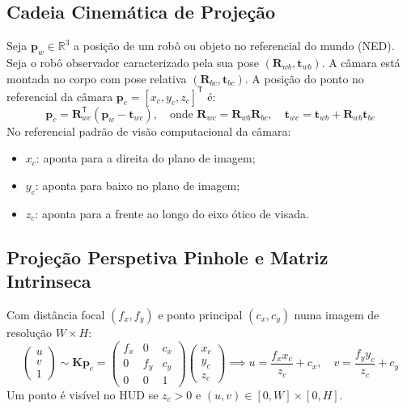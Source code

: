 \documentclass[11pt,a4paper]{article}
\newcommand{\vv}[1]{\mathbf{#1}}
\newcommand{\Rot}{\mathbf{R}}
\newcommand{\T}{^{\mathsf{T}}}
\theoremstyle{definition}
\begin{document}
\subsection{Cadeia Cinemática de Projeção}
Seja $\vv{p}_w \in \mathbb{R}^3$ a posição de um robô ou objeto no referencial do mundo (NED). Seja o robô observador caracterizado pela sua pose $(\Rot_{wb}, \vv{t}_{wb})$. A câmara está montada no corpo com pose relativa $(\Rot_{bc}, \vv{t}_{bc})$. A posição do ponto no referencial da câmara $\vv{p}_c = [x_c, y_c, z_c]\T$ é:
\begin{equation}
    \vv{p}_c = \Rot_{wc}\T (\vv{p}_w - \vv{t}_{wc}), \quad \text{onde } \Rot_{wc} = \Rot_{wb}\Rot_{bc}, \quad \vv{t}_{wc} = \vv{t}_{wb} + \Rot_{wb}\vv{t}_{bc}
\end{equation}
No referencial padrão de visão computacional da câmara:
\begin{itemize}[nosep]
    \item $x_c$: aponta para a direita do plano de imagem;
    \item $y_c$: aponta para baixo no plano de imagem;
    \item $z_c$: aponta para a frente ao longo do eixo ótico de visada.
\end{itemize}

\subsection{Projeção Perspetiva Pinhole e Matriz Intrinseca}
Com distância focal $(f_x, f_y)$ e ponto principal $(c_x, c_y)$ numa imagem de resolução $W \times H$:
\begin{equation}
\begin{pmatrix} u \\ v \\ 1 \end{pmatrix} \sim 
\mathbf{K} \vv{p}_c = 
\begin{pmatrix}
f_x & 0 & c_x \\
0 & f_y & c_y \\
0 & 0 & 1
\end{pmatrix}
\begin{pmatrix} x_c \\ y_c \\ z_c \end{pmatrix} \implies
u = \frac{f_x x_c}{z_c} + c_x, \quad
v = \frac{f_y y_c}{z_c} + c_y
\end{equation}
Um ponto é visível no HUD se $z_c > 0$ e $(u, v) \in [0, W] \times [0, H]$.
\end{document}
